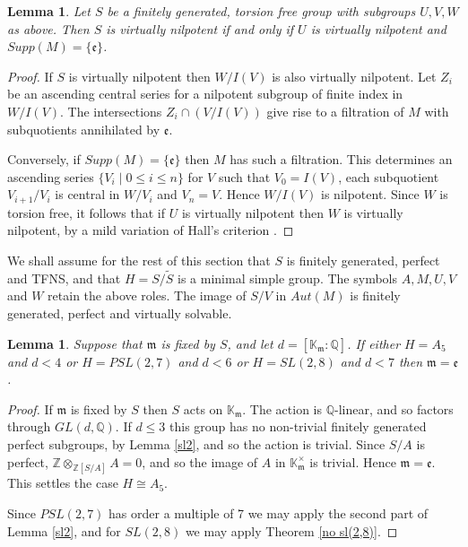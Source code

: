 \documentclass[12pt]{amsart}
\renewcommand{\leq}{\leqslant}
\newtheorem{lemma}[theorem]{Lemma}
\begin{document}
\begin{lemma}
\label{vHall}
Let $S$ be a finitely generated,  torsion free group with subgroups $U,V,W$ 
as above.
Then $S$ is virtually nilpotent if and only if $U$ is virtually nilpotent 
and $Supp(M)=\{\mathfrak{e}\}$.
\end{lemma}

\begin{proof}
If $S$ is virtually nilpotent then $W/I(V)$ is also virtually nilpotent.
Let $Z_i$ be an ascending central series for a nilpotent subgroup of finite index
in $W/I(V)$.
The  intersections $Z_i\cap(V/I(V))$ give rise to a filtration of $M$ 
with subquotients annihilated by $\mathfrak{e}$.

Conversely, if $Supp(M)=\{\mathfrak{e}\}$ then $M$ has such a filtration.
This determines an ascending series $\{V_i\mid0\leq{i}\leq{n}\}$ for 
$V$ such that $V_0=I(V)$,  
each subquotient $V_{i+1}/V_i$ is central in $W/V_i$ and $V_n=V$. 
Hence $W/I(V)$ is nilpotent.
Since $W$ is torsion free,
it follows that if $U$ is virtually nilpotent then
$W$ is virtually nilpotent, by a mild variation of Hall's criterion \cite[5.2.10]{Ro}.
\end{proof}

We shall assume for the rest of this section that $S$ is finitely generated,
perfect and TFNS,
and that $H=S/\widetilde{S}$ is a minimal simple group.
The symbols $A, M,U,V$ and $W$ retain the above roles.
The image of $S/V$ in $Aut(M)$ is finitely generated, 
perfect and virtually solvable.

\begin{lemma}
\label{mfixed}
Suppose that $\mathfrak{m}$ is fixed by $S$, and let 
$d=[\mathbb{K}_\mathfrak{m}:\mathbb{Q}]$.
If either $H=A_5$ and $d<4$ or $H=PSL(2,7)$ and $d<6$ 
or $H=SL(2,8)$ and $d<7$
then $\mathfrak{m}=\mathfrak{e}$.
\end{lemma}

\begin{proof}
If $\mathfrak{m}$ is fixed by $S$ then $S$ acts on $\mathbb{K}_\mathfrak{m}$.
The action is $\mathbb{Q}$-linear, and so factors through $GL(d,\mathbb{Q})$.
If $d\leq3$ this group has no non-trivial finitely generated perfect subgroups,
by Lemma \ref{sl2},
and so the action is trivial.
Since $S/A$ is perfect, 
$\mathbb{Z}\otimes_{\mathbb{Z}[S/A]}A=0$, 
and so the image of $A$ in $\mathbb{K}_\mathfrak{m}^\times$ is trivial.
Hence $\mathfrak{m}=\mathfrak{e}$.
This settles the case $H\cong{A_5}$. 

Since $PSL(2,7)$ has order a multiple of 7 we may apply the second part of
Lemma \ref{sl2}, and for $SL(2,8)$ we may apply Theorem \ref{no sl(2,8)}.
\end{proof}
\end{document}
